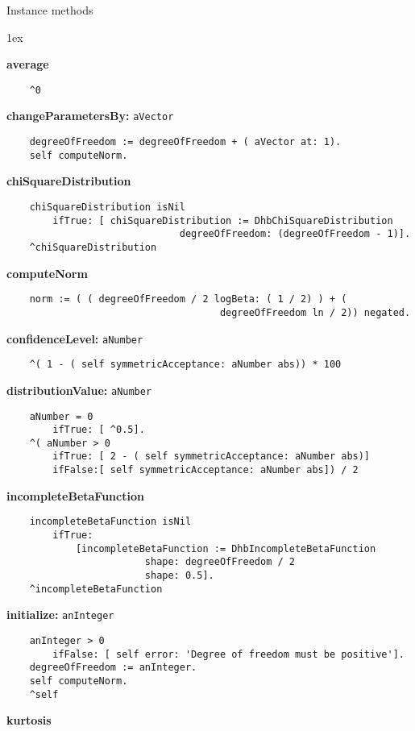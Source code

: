 Instance methods
{\parskip 1ex\par\noindent}
{\bf average}
\begin{verbatim}
    ^0

\end{verbatim}
{\bf changeParametersBy:} {\tt aVector}
\begin{verbatim}
    degreeOfFreedom := degreeOfFreedom + ( aVector at: 1).
    self computeNorm.

\end{verbatim}
{\bf chiSquareDistribution}
\begin{verbatim}
    chiSquareDistribution isNil
        ifTrue: [ chiSquareDistribution := DhbChiSquareDistribution 
                              degreeOfFreedom: (degreeOfFreedom - 1)].
    ^chiSquareDistribution

\end{verbatim}
{\bf computeNorm}
\begin{verbatim}
    norm := ( ( degreeOfFreedom / 2 logBeta: ( 1 / 2) ) + ( 
                                     degreeOfFreedom ln / 2)) negated.

\end{verbatim}
{\bf confidenceLevel:} {\tt aNumber}
\begin{verbatim}
    ^( 1 - ( self symmetricAcceptance: aNumber abs)) * 100

\end{verbatim}
{\bf distributionValue:} {\tt aNumber}
\begin{verbatim}
    aNumber = 0
        ifTrue: [ ^0.5].
    ^( aNumber > 0
        ifTrue: [ 2 - ( self symmetricAcceptance: aNumber abs)]
        ifFalse:[ self symmetricAcceptance: aNumber abs]) / 2

\end{verbatim}
{\bf incompleteBetaFunction}
\begin{verbatim}
    incompleteBetaFunction isNil 
        ifTrue: 
            [incompleteBetaFunction := DhbIncompleteBetaFunction 
                        shape: degreeOfFreedom / 2
                        shape: 0.5].
    ^incompleteBetaFunction

\end{verbatim}
{\bf initialize:} {\tt anInteger}
\begin{verbatim}
    anInteger > 0
        ifFalse: [ self error: 'Degree of freedom must be positive'].
    degreeOfFreedom := anInteger.
    self computeNorm.
    ^self

\end{verbatim}
{\bf kurtosis}
